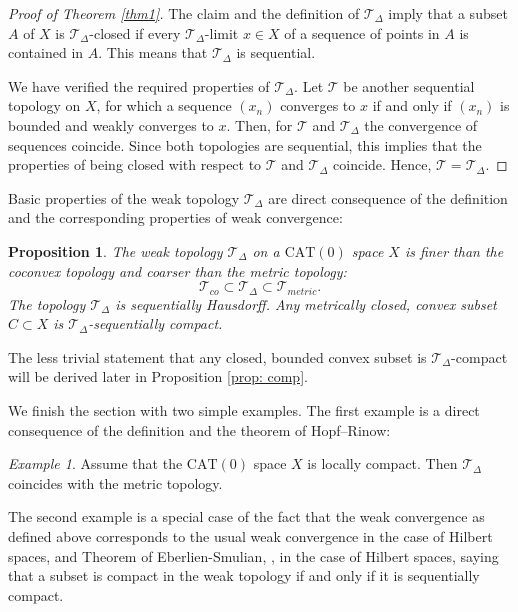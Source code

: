 \documentclass[12pt,leqno]{amsart}
\numberwithin{equation}{section}
\newtheorem{prop}[thm]{Proposition}
\theoremstyle{remark}
\newtheorem{ex}[thm]{Example}
\newcommand{\CAT}{\mathrm{CAT}}
\begin{document}
\begin{proof}[Proof of Theorem \ref{thm1}]
The claim and the definition of $\mathcal T_{\Delta}$ imply that a subset $A$ of $X$ is $\mathcal T_{\Delta}$-closed if every $\mathcal T_{\Delta}$-limit $x\in X$ of a sequence of points in $A$ is contained in $A$. This means that $\mathcal T_{\Delta}$ is sequential.

We have verified the required properties of $\mathcal T_{\Delta}$. Let $\mathcal T$
be another sequential topology on $X$, for which a sequence $(x_n)$ converges 
to $x$ if and only if $(x_n)$ is bounded and weakly converges to $x$. Then, for $\mathcal T$ and $\mathcal T_{\Delta}$ the convergence of sequences coincide. Since both topologies are sequential, this implies that the properties of being closed with respect to $\mathcal T$ and $\mathcal T_{\Delta}$ coincide. Hence, $\mathcal T=\mathcal T_{\Delta}$.
\end{proof}

Basic properties of the weak topology $\mathcal T_{\Delta}$ are direct consequence
of the definition and the corresponding properties of weak convergence:

\begin{prop} \label{prop: delta}
The weak topology $\mathcal T_{\Delta}$ on a $\CAT(0)$ space $X$ 
is finer than the coconvex topology and coarser than the metric topology:
$$\mathcal T_{co} \subset \mathcal T_{\Delta}\subset \mathcal T_{metric} .$$
The topology $\mathcal T_{\Delta}$ is sequentially Hausdorff. Any metrically closed, convex subset $C\subset X$ 
is $\mathcal T_{\Delta}$-sequentially compact.
\end{prop}

The less trivial statement that any closed, bounded convex subset is $\mathcal T_{\Delta}$-compact will be derived later in Proposition \ref{prop: comp}. 

We finish the section with two simple examples. The first example is a direct consequence of the definition and the theorem of Hopf--Rinow:

\begin{ex}
Assume that the $\CAT(0)$ space $X$ is locally compact. Then $\mathcal T_{\Delta}$ coincides with the metric topology. 
\end{ex}

The second example is a special case of the fact that 
the weak convergence as defined above corresponds to the usual weak convergence in the case of Hilbert spaces, \cite{Bac} and Theorem of Eberlien-Smulian, \cite{Eberlein}, in the case of Hilbert spaces, saying that a subset is compact in the weak topology if and only if it is sequentially compact. 
\end{document}
